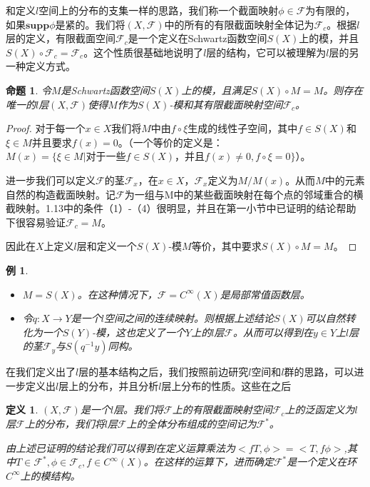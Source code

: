 \documentclass{article}
\newtheorem{example}{例}
\newtheorem{definition}{定义}
\newtheorem{proposition}{命题}
\newtheorem{proof}{证明}
\begin{document}
和定义$l$空间上的分布的支集一样的思路，我们称一个截面映射$\phi\in 
\mathcal{F}$为有限的，如果$\mathbf{supp}\phi$是紧的。我们将$(X,\mathcal{F})$中的所有的有限截面映射全体记为$\mathcal{F}_{c}$。根据$l$层的定义，有限截面空间$\mathcal{F}_{c}$是一个定义在Schwartz函数空间$S(X)$上的模，并且$S(X)\circ \mathcal{F}_{c}=\mathcal{F}_{c}$。这个性质很基础地说明了$l$层的结构，它可以被理解为$l$层的另一种定义方式。
\begin{proposition}
    令$M$是Schwartz函数空间$S(X)$上的模，且满足$S(X)\circ M=M$。则存在唯一的$l$层$(X,\mathcal{F})$使得$M$作为$S(X)$-模和其有限截面映射空间$\mathcal{F}_{c}$。 
\end{proposition}
\begin{proof}
对于每一个$x\in X$我们将$M$中由$f\circ\xi$生成的线性子空间，其中$f\in S(X)$和$\xi\in M$并且要求$f(x)=0$。（一个等价的定义是：$M(x)=\{\xi\in M|\text{对于一些}f\in S(X)，\text{并且}f(x)\not=0,f\circ\xi=0\}$）。

进一步我们可以定义$\mathcal{F}$的茎$\mathcal{F}_{x}$，在$x\in X$，$\mathcal{F}_{x}$定义为$M/ M(x)$。从而$M$中的元素自然的构造截面映射。记$\mathcal{F}$为一组与M中的某些截面映射在每个点的邻域重合的横截映射。1.13中的条件（1）-（4）很明显，并且在第一小节中已证明的结论帮助下很容易验证$\mathcal{F}_{c}=M$。

因此在$X$上定义$l$层和定义一个$S(X)$-模$M$等价，其中要求$S(X)\circ M=M$。
\end{proof}
\begin{example}
\begin{itemize}
    \item $M=S(X)$。在这种情况下，$\mathcal{F}=C^{\infty}(X)$是局部常值函数层。
    \item 令$q:X\rightarrow Y$是一个$l$空间之间的连续映射。则根据上述结论$S(X)$可以自然转化为一个$S(Y)$-模，这也定义了一个$Y$上的$l$层$\mathcal{F}$。从而可以得到在$y\in Y$上$l$层的茎$\mathcal{F}_{y}$与$S(q^{-1}y)$同构。
\end{itemize}
\end{example}
在我们定义出了$l$层的基本结构之后，我们按照前边研究$l$空间和$l$群的思路，可以进一步定义出$l$层上的分布，并且分析$l$层上分布的性质。这些在之后
\begin{definition}
$(X,\mathcal{F})$是一个$l$层。我们将$\mathcal{F}$上的有限截面映射空间$\mathcal{F}_{c}$上的泛函定义为$l$层$\mathcal{F}$上的分布，我们将$l$层$\mathcal{F}$上的全体分布组成的空间记为$\mathcal{F}^{*}$。

由上述已证明的结论我们可以得到在定义运算乘法为$<fT,\phi>=<T,f\phi>$,其中$T\in \mathcal{F}^{*},\phi\in \mathcal{F}_{c},f\in C^{\infty}(X)$。在这样的运算下，进而确定$\mathcal{F}^{*}$是一个定义在环$C^{\infty}$上的模结构。
\end{definition}
\end{document}
